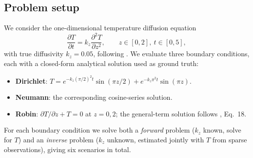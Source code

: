 \subsection{Problem setup}
We consider the one-dimensional temperature diffusion equation
\begin{equation}
  \frac{\partial T}{\partial t} = k_z \frac{\partial^2 T}{\partial z^2},
  \qquad z \in [0, 2],\ t \in [0, 5],
\end{equation}
with true diffusivity $k_z = 0.05$, following \citet{han2026seawater}.
We evaluate three boundary
conditions, each with a closed-form analytical solution used as ground
truth:
\begin{itemize}
  \item \textbf{Dirichlet}: $T = e^{-k_z(\pi/2)^2 t}\sin(\pi z/2) +
    e^{-k_z \pi^2 t}\sin(\pi z)$.
  \item \textbf{Neumann}: the corresponding cosine-series solution.
  \item \textbf{Robin}: $\partial T/\partial z + T = 0$ at $z=0,2$; the
    general-term solution follows \citet{han2026seawater}, Eq.~18.
\end{itemize}
For each boundary condition we solve both a \emph{forward} problem
($k_z$ known, solve for $T$) and an \emph{inverse} problem ($k_z$ unknown,
estimated jointly with $T$ from sparse observations), giving six scenarios
in total.


